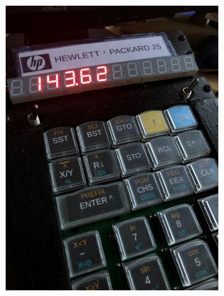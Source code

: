 \documentclass{beamer}
\begin{document}
\begin{frame}[fragile]
\begin{columns}
  \includegraphics[width=\textwidth]{figs/led-close.jpg}

  \end{columns}
\end{frame}
\end{document}
